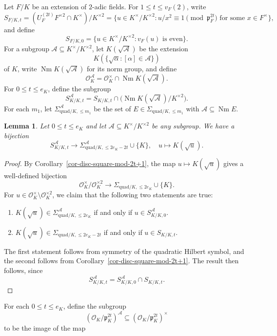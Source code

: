 \documentclass[11pt]{amsart}
\theoremstyle{theorem}
\newtheorem{lemma}[theorem]{Lemma}
\theoremstyle{example}
\theoremstyle{definition}
\numberwithin{theorem}{section}
\numberwithin{theorem}{section}
\DeclareMathOperator{\Nm}{Nm}
\newcommand{\co}{\mathcal{O}}
\newcommand{\p}{\mathfrak{p}}
\newcommand{\quadr}{\mathrm{quad}}
\begin{document}
Let $F/K$ be an extension of $2$-adic fields. For $1 \leq t \leq v_F(2)$, write
$$
S_{F/K, t} = (U_F^{(2t)}F^{\times 2} \cap K^\times) / K^{\times 2} = \{u \in K^\times / K^{\times 2} : u/x^2 \equiv 1\pmod{\p_F^{2t}} \text{ for some $x \in F^\times$}\},
$$
and define 
$$
S_{F/K,0} = \{u\in K^\times / K^{\times 2} : v_F(u)\text{ is even}\}.
$$
For a subgroup $\mathcal{A}\subseteq K^\times / K^{\times 2}$, let $K(\sqrt{\mathcal{A}})$ be the extension 
$$
K(\{\sqrt{\alpha} : [\alpha] \in \mathcal{A}\})
$$
of $K$, write $\Nm K(\sqrt{\mathcal{A}})$ for its norm group, and define 
$$
\co_K^{\mathcal{A}} = \co_K^\times \cap \Nm K(\sqrt{\mathcal{A}}). 
$$
For $0 \leq t \leq e_K$, define the subgroup
$$
S_{K/K,t}^{\mathcal{A}} =  S_{K/K,t} \cap \Big(\Nm K(\sqrt{\mathcal{A}})/K^{\times 2}\Big).
$$
For each $m_1$, let $\Sigma_{\quadr/K,\leq m_1}^{\mathcal{A}}$ be the set of $E \in \Sigma_{\quadr/K,\leq m_1}$ with $\mathcal{A}\subseteq \Nm E$. 
\begin{lemma}
    \label{lem-bij-SKKtA-Sigma-quad-A}
    Let $0 \leq t \leq e_K$ and let $\mathcal{A}\subseteq K^\times / K^{\times 2}$ be any subgroup. We have a bijection
    $$
    S_{K/K,t}^\mathcal{A} \to \Sigma_{\quadr/K,\leq 2e_K - 2t}^{\mathcal{A}} \cup \{K\}, \quad u \mapsto K(\sqrt{u}).
    $$
\end{lemma}
\begin{proof}
    By Corollary~\ref{cor-disc-square-mod-2t+1}, the map $u\mapsto K(\sqrt{u})$ gives a well-defined bijection 
    $$
    \co_K^{\times} / \co_K^{\times 2} \to \Sigma_{\quadr/K, \leq 2e_K} \cup \{K\}. 
    $$
    For $u \in \co_K^\times\setminus \co_K^{\times 2}$, we claim that the following two statements are true:
    \begin{enumerate} 
        \item $K(\sqrt{u}) \in \Sigma_{\quadr/K,\leq 2e_K}^\mathcal{A}$ if and only if $u \in S_{K/K,0}^\mathcal{A}$.
        \item $K(\sqrt{u}) \in \Sigma_{\quadr/K, \leq 2e_K - 2t}$ if and only if $u \in S_{K/K,t}$. 
    \end{enumerate}
    The first statement follows from symmetry of the quadratic Hilbert symbol, and the second follows from Corollary~\ref{cor-disc-square-mod-2t+1}.
    The result then follows, since 
    $$
    S_{K/K,t}^\mathcal{A} = S_{K/K,0}^\mathcal{A} \cap S_{K/K,t}.
    $$
\end{proof}
For each $0 \leq t \leq e_K$, define the subgroup
$$
(\co_K/\p_K^{2t})^\mathcal{A}\subseteq (\co_K/\p_K^{2t})^\times
$$
to be the image of the map 
\end{document}
